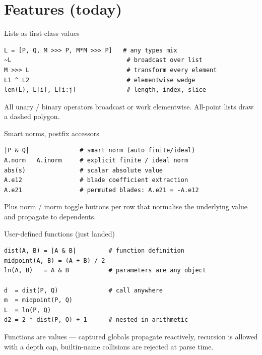 \documentclass[aspectratio=169,11pt]{beamer}
\begin{document}
\section{Features (today)}

\begin{frame}[fragile]{Lists as first-class values}
\begin{lstlisting}
L = [P, Q, M >>> P, M*M >>> P]   # any types mix
~L                                # broadcast over list
M >>> L                           # transform every element
L1 ^ L2                           # elementwise wedge
len(L), L[i], L[i:j]              # length, index, slice
\end{lstlisting}
  All unary / binary operators broadcast or work elementwise.
  All-point lists draw a dashed polygon.
\end{frame}

\begin{frame}[fragile]{Smart norms, postfix accessors}
\begin{lstlisting}
|P & Q|              # smart norm (auto finite/ideal)
A.norm   A.inorm     # explicit finite / ideal norm
abs(s)               # scalar absolute value
A.e12                # blade coefficient extraction
A.e21                # permuted blades: A.e21 = -A.e12
\end{lstlisting}
  Plus norm / inorm toggle buttons per row that normalise the underlying
  value and propagate to dependents.
\end{frame}

\begin{frame}[fragile]{User-defined functions (just landed)}
\begin{lstlisting}
dist(A, B) = |A & B|         # function definition
midpoint(A, B) = (A + B) / 2
ln(A, B)   = A & B           # parameters are any object

d  = dist(P, Q)              # call anywhere
m  = midpoint(P, Q)
L  = ln(P, Q)
d2 = 2 * dist(P, Q) + 1      # nested in arithmetic
\end{lstlisting}
  Functions are values — captured globals propagate reactively,
  recursion is allowed with a depth cap, builtin-name collisions are
  rejected at parse time.
\end{frame}
\end{document}
